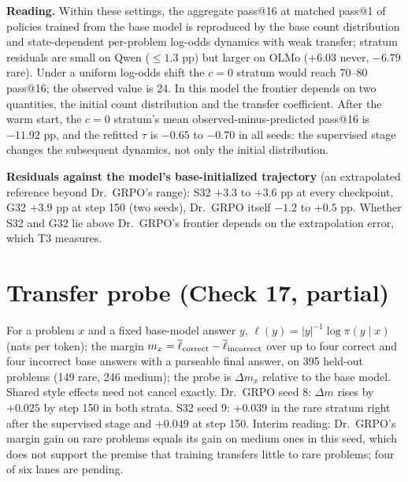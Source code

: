 \documentclass[10pt]{article}
\begin{document}
\textbf{Reading.} Within these settings, the aggregate pass@16 at matched pass@1 of policies trained from the base model is reproduced by the base count distribution and state-dependent per-problem log-odds dynamics with weak transfer; stratum residuals are small on Qwen ($\le1.3$ pp) but larger on OLMo ($+6.03$ never, $-6.79$ rare). Under a uniform log-odds shift the $c=0$ stratum would reach 70--80 pass@16; the observed value is 24. In this model the frontier depends on two quantities, the initial count distribution and the transfer coefficient. After the warm start, the $c=0$ stratum's mean observed-minus-predicted pass@16 is $-11.92$ pp, and the refitted $\tau$ is $-0.65$ to $-0.70$ in all seeds: the supervised stage changes the subsequent dynamics, not only the initial distribution.

\textbf{Residuals against the model's base-initialized trajectory} (an extrapolated reference beyond Dr.\ GRPO's range): S32 $+3.3$ to $+3.6$ pp at every checkpoint, G32 $+3.9$ pp at step 150 (two seeds), Dr.\ GRPO itself $-1.2$ to $+0.5$ pp. Whether S32 and G32 lie above Dr.\ GRPO's frontier depends on the extrapolation error, which T3 measures.

\section{Transfer probe (Check 17, partial)}
For a problem $x$ and a fixed base-model answer $y$, $\ell(y)=|y|^{-1}\log\pi(y\mid x)$ (nats per token); the margin $m_x=\overline\ell_{\rm correct}-\overline\ell_{\rm incorrect}$ over up to four correct and four incorrect base answers with a parseable final answer, on 395 held-out problems (149 rare, 246 medium); the probe is $\Delta m_x$ relative to the base model. Shared style effects need not cancel exactly. Dr.\ GRPO seed 8: $\Delta m$ rises by $+0.025$ by step 150 in both strata. S32 seed 9: $+0.039$ in the rare stratum right after the supervised stage and $+0.049$ at step 150. Interim reading: Dr.\ GRPO's margin gain on rare problems equals its gain on medium ones in this seed, which does not support the premise that training transfers little to rare problems; four of six lanes are pending.
\end{document}
